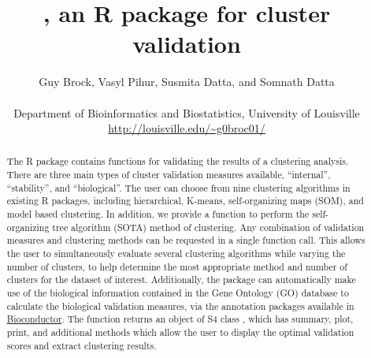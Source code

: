 \documentclass[11pt]{article}
\begin{document}
\author{Guy Brock, Vasyl
  Pihur, Susmita Datta, and Somnath Datta \\ \\
Department of Bioinformatics and Biostatistics, University of
Louisville \\
\url{http://louisville.edu/~g0broc01/} }

\title{, an R package for cluster validation}

\maketitle

\tableofcontents

\begin{abstract}
The R package  contains functions for validating the results
of a clustering analysis.  There are three main types of cluster
validation measures available, ``internal'', ``stability'', and
``biological''.  
The user can choose from nine clustering algorithms in
existing R packages, including
hierarchical, K-means, self-organizing maps (SOM), and model based clustering. 
In addition, we provide a function to perform the self-organizing tree
algorithm (SOTA) method of clustering.
Any combination of validation measures and
clustering methods can be requested in a single function call.  This allows the user to
simultaneously evaluate several clustering algorithms while varying
the number of clusters, to help determine the most appropriate method and
number of clusters for the dataset of interest.  
Additionally, the package can automatically make use of the biological
information contained in the Gene Ontology (GO) database to calculate
the biological validation measures, via the annotation packages
available in \href{http://www.bioconductor.org/}{Bioconductor}.
The function
returns an object of S4 class , which has summary, plot,
print, and additional methods which allow the user to display the optimal
validation scores and extract clustering results.  
\end{abstract}



\end{document}
